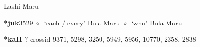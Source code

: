 \begin{list}{}{\leftmargin=1.5em \itemindent=-1.5em}
         Lashi 
\hspace{1ex}
         Maru 
  \item {\footnotesize \textbf{*juk}}{\tiny 3529}
\hspace{1ex}
         $\diamond$~`each / every'
         Bola 
\hspace{1ex}
         Maru 
\hspace{1ex}
         $\diamond$~`who'
         Bola 
\hspace{1ex}
         Maru 
  \end{list}
\item
\textbf{*kaH}
?
  {\tiny crossid 9371, 5298, 3250, 5949, 5956, 10770, 2358, 2838}
